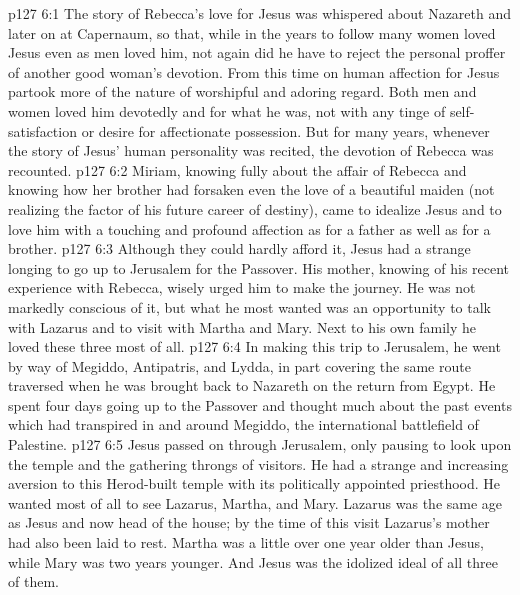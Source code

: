 \vs p127 6:1 The story of Rebecca’s love for Jesus was whispered about Nazareth and later on at Capernaum, so that, while in the years to follow many women loved Jesus even as men loved him, not again did he have to reject the personal proffer of another good woman’s devotion. From this time on human affection for Jesus partook more of the nature of worshipful and adoring regard. Both men and women loved him devotedly and for what he was, not with any tinge of self\hyp{}satisfaction or desire for affectionate possession. But for many years, whenever the story of Jesus’ human personality was recited, the devotion of Rebecca was recounted.
\vs p127 6:2 Miriam, knowing fully about the affair of Rebecca and knowing how her brother had forsaken even the love of a beautiful maiden (not realizing the factor of his future career of destiny), came to idealize Jesus and to love him with a touching and profound affection as for a father as well as for a brother.
\vs p127 6:3 \pc Although they could hardly afford it, Jesus had a strange longing to go up to Jerusalem for the Passover. His mother, knowing of his recent experience with Rebecca, wisely urged him to make the journey. He was not markedly conscious of it, but what he most wanted was an opportunity to talk with Lazarus and to visit with Martha and Mary. Next to his own family he loved these three most of all.
\vs p127 6:4 In making this trip to Jerusalem, he went by way of Megiddo, Antipatris, and Lydda, in part covering the same route traversed when he was brought back to Nazareth on the return from Egypt. He spent four days going up to the Passover and thought much about the past events which had transpired in and around Megiddo, the international battlefield of Palestine.
\vs p127 6:5 Jesus passed on through Jerusalem, only pausing to look upon the temple and the gathering throngs of visitors. He had a strange and increasing aversion to this Herod\hyp{}built temple with its politically appointed priesthood. He wanted most of all to see Lazarus, Martha, and Mary. Lazarus was the same age as Jesus and now head of the house; by the time of this visit Lazarus’s mother had also been laid to rest. Martha was a little over one year older than Jesus, while Mary was two years younger. And Jesus was the idolized ideal of all three of them.

